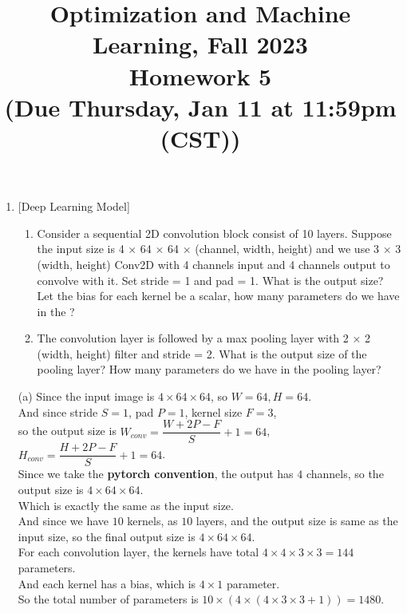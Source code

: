 \documentclass[10pt]{article}
\begin{document}
\date{}
\title{Optimization and Machine Learning, Fall 2023 \\
	Homework 5 \\
	\small (Due Thursday, Jan 11 at 11:59pm (CST))}
\maketitle
\begin{enumerate}[1.]

	\item {} [Deep Learning Model]
	\begin{enumerate}
		\item Consider a sequential 2D convolution block consist of 10 layers. Suppose the input size is 4 $\times$ 64 $\times$ 64 $\times$ (channel, width, height) and
		we use 3 $\times$ 3 (width, height) Conv2D with 4 channels input and 4 channels output to convolve with it. Set stride = 1 and pad = 1. What is the output size? Let the bias for each kernel be a scalar, how many parameters do we have in the ? 
		\item The convolution layer is followed by a max pooling layer with 2 × 2 (width, height) filter and stride
		= 2. What is the output size of the pooling layer? How many parameters do we have in the pooling
		layer? 
	\end{enumerate}
	
(a) Since the input image is $4\times 64\times 64$, so $W=64,H=64$.\\
And since stride $S=1$, pad $P=1$, kernel size $F=3$,\\
so the output size is $W_{conv}=\dfrac{W+2P-F}{S}+1=64$, $H_{conv}=\dfrac{H+2P-F}{S}+1=64$.\\
Since we take the \textbf{pytorch convention}, the output has $4$ channels, so the output size is $4\times 64\times 64$.\\
Which is exactly the same as the input size.\\
And since we have $10$ kernels, as $10$ layers, and the output size is same as the input size, so the final output size is $4\times 64\times 64$.\\

For each convolution layer, the kernels have total $4\times 4\times 3\times 3=144$ parameters.\\
And each kernel has a bias, which is $4\times 1$ parameter.\\
So the total number of parameters is $10\times (4\times(4\times 3\times 3+1))=1480$.\\


\end{enumerate}
\end{document}
